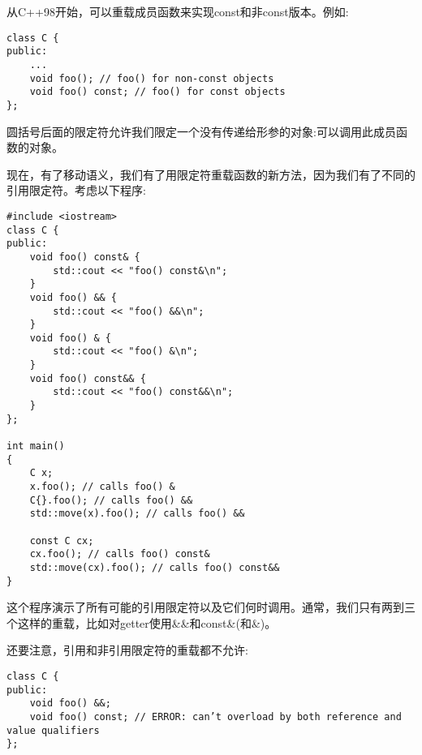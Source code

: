 从C++98开始，可以重载成员函数来实现const和非const版本。例如:\par

\begin{lstlisting}[caption={}]
class C {
public:
	...
	void foo(); // foo() for non-const objects
	void foo() const; // foo() for const objects
};
\end{lstlisting}

圆括号后面的限定符允许我们限定一个没有传递给形参的对象:可以调用此成员函数的对象。\par

现在，有了移动语义，我们有了用限定符重载函数的新方法，因为我们有了不同的引用限定符。考虑以下程序:\par

{\color{red}{basics/refqual.cpp}}

\begin{lstlisting}[caption={}]
#include <iostream>
class C {
public:
	void foo() const& {
		std::cout << "foo() const&\n";
	}
	void foo() && {
		std::cout << "foo() &&\n";
	}
	void foo() & {
		std::cout << "foo() &\n";
	}
	void foo() const&& {
		std::cout << "foo() const&&\n";
	}
};

int main()
{
	C x;
	x.foo(); // calls foo() &
	C{}.foo(); // calls foo() &&
	std::move(x).foo(); // calls foo() &&
	
	const C cx;
	cx.foo(); // calls foo() const&
	std::move(cx).foo(); // calls foo() const&&
}
\end{lstlisting}

这个程序演示了所有可能的引用限定符以及它们何时调用。通常，我们只有两到三个这样的重载，比如对getter使用\&\&和const\&(和\&)。\par

还要注意，引用和非引用限定符的重载都不允许:\par

\begin{lstlisting}[caption={}]
class C {
public:
	void foo() &&;
	void foo() const; // ERROR: can’t overload by both reference and value qualifiers
};
\end{lstlisting}

























































